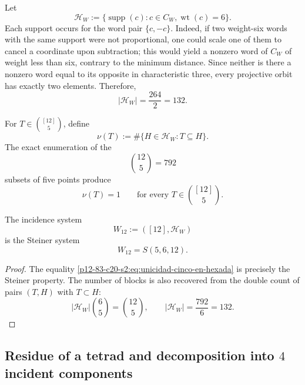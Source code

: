 Let
\begin{equation}
 \mathcal H_W
 :=\{\operatorname{supp}(c):c\in C_W,
                              \operatorname{wt}(c)=6\}.
 \label{p12-83-c20-s2:eq:familia-soportes-peso-seis}
\end{equation}
Each support occurs for the word pair \(\{c,-c\}\). Indeed, if two
weight-six words with the same support were not proportional, one could
scale one of them to cancel a coordinate upon subtraction; this would yield
a nonzero word of \(C_W\) of weight less than six, contrary to the minimum
distance. Since neither is there a nonzero word equal to its opposite in
characteristic three, every projective orbit has exactly two elements.
Therefore,
\begin{equation}
 |\mathcal H_W|=\frac{264}{2}=132.
 \label{p12-83-c20-s2:eq:numero-hexadas-cw}
\end{equation}

For \(T\in\binom{[12]}5\), define
\begin{equation}
 \nu(T):=\#\{H\in\mathcal H_W:T\subseteq H\}.
 \label{p12-83-c20-s2:eq:incidencia-cinco-hexada}
\end{equation}
The exact enumeration of the
\[
 \binom{12}{5}=792
\]
subsets of five points produce
\begin{equation}
 \nu(T)=1
 \qquad
 \text{for every }T\in\binom{[12]}5.
 \label{p12-83-c20-s2:eq:unicidad-cinco-en-hexada}
\end{equation}

\begin{theorem}
\label{p12-83-c20-s2:thm:w12-autonomo}
The incidence system
\[
 W_{12}:=([12],\mathcal H_W)
\]
is the Steiner system
\begin{equation}
 \boxed{W_{12}=S(5,6,12).}
 \label{p12-83-c20-s2:eq:w12-steiner-autonomo}
\end{equation}
\end{theorem}

\begin{proof}
The equality \eqref{p12-83-c20-s2:eq:unicidad-cinco-en-hexada} is precisely the
Steiner property. The number of blocks is also recovered from the double
count of pairs \((T,H)\) with \(T\subset H\):
\[
 |\mathcal H_W|\binom65=\binom{12}{5},
 \qquad
 |\mathcal H_W|=\frac{792}{6}=132.
\]
\end{proof}

\subsection{Residue of a tetrad and decomposition into \(4\) incident components}

